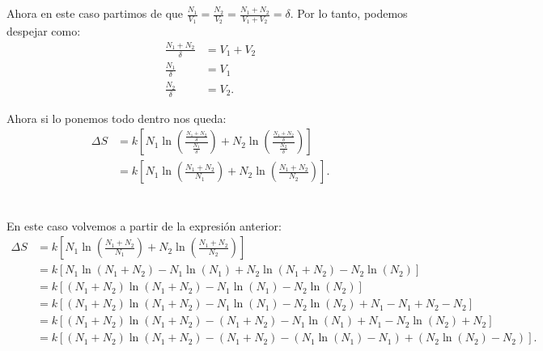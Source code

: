 \documentclass{report}
\begin{document}
\section{}

Ahora en este caso partimos de que $\frac{N_1}{V_1} = \frac{N_2}{V_2} = \frac{N_1 + N_2}{V_1 + V_2} = \delta$. Por lo tanto, podemos despejar como:
\begin{align*}
  \frac{N_1 + N_2}{\delta} &= V_1 + V_2 \\
  \frac{N_1}{\delta} &= V_1 \\
  \frac{N_2}{\delta} &= V_2
.\end{align*}

Ahora si lo ponemos todo dentro nos queda:
\begin{align*}
  \Delta S &= k\left[ N_1 \ln \left( \frac{\frac{N_1 + N_2}{\delta}}{\frac{N_1}{\delta}} \right)  + N_2 \ln\left( \frac{\frac{N_1 + N_2}{\delta}}{\frac{N_2}{\delta}} \right) \right]\\
  &= k\left[ N_1 \ln \left( \frac{N_1 + N_2}{N_1} \right)  + N_2 \ln\left( \frac{N_1 + N_2}{N_2} \right) \right]
.\end{align*}

\section{}

En este caso volvemos a partir de la expresión anterior:
\begin{align*}
  \Delta S &= k\left[ N_1 \ln \left( \frac{N_1 + N_2}{N_1} \right)  + N_2 \ln\left( \frac{N_1 + N_2}{N_2} \right) \right]\\
  &= k\left[ N_1 \ln \left( N_1 + N_2 \right) - N_1\ln\left( N_1 \right)  + N_2 \ln\left( N_1 + N_2\right) - N_2\ln\left( N_2 \right)  \right]\\
  &= k\left[ \left( N_1 + N_2 \right)  \ln \left( N_1 + N_2 \right) - N_1\ln\left( N_1 \right) - N_2\ln\left( N_2 \right)  \right] \\
  &= k\left[ \left( N_1 + N_2 \right)  \ln \left( N_1 + N_2 \right) - N_1\ln\left( N_1 \right) - N_2\ln\left( N_2 \right) + N_1 - N_1 + N_2 - N_2 \right] \\
  &= k\left[ \left( N_1 + N_2 \right)  \ln \left( N_1 + N_2 \right) - \left( N_1 + N_2 \right) - N_1\ln\left( N_1 \right) + N_1 - N_2\ln\left( N_2 \right) + N_2 \right] \\
  &= k\left[ \left( N_1 + N_2 \right)  \ln \left( N_1 + N_2 \right) - \left( N_1 + N_2 \right) - \left(N_1\ln\left( N_1 \right) - N_1\right) + \left(N_2\ln\left( N_2 \right) - N_2\right) \right]
.\end{align*}
\end{document}
